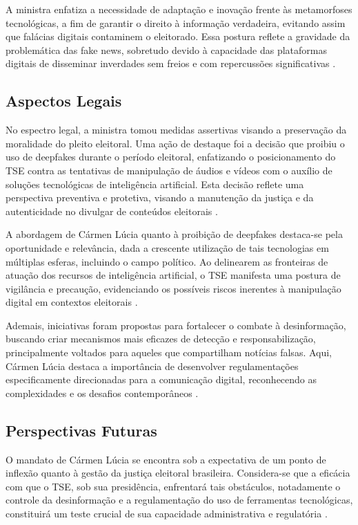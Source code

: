 \documentclass[
   article,       
   12pt,          
   oneside,       
   a4paper,       
   english,       
   brazil,        
   sumario=tradicional
   ]{abntex2}
\begin{document}
A ministra enfatiza a necessidade de adaptação e inovação frente às metamorfoses tecnológicas, a fim de garantir o direito à informação verdadeira, evitando assim que falácias digitais contaminem o eleitorado. Essa postura reflete a gravidade da problemática das fake news, sobretudo devido à capacidade das plataformas digitais de disseminar inverdades sem freios e com repercussões significativas \cite{Contra_o_virus_da_mentira_ha_o_remedio_da_inf}.

\subsection{Aspectos Legais}

No espectro legal, a ministra tomou medidas assertivas visando a preservação da moralidade do pleito eleitoral. Uma ação de destaque foi a decisão que proibiu o uso de deepfakes durante o período eleitoral, enfatizando o posicionamento do TSE contra as tentativas de manipulação de áudios e vídeos com o auxílio de soluções tecnológicas de inteligência artificial. Esta decisão reflete uma perspectiva preventiva e protetiva, visando a manutenção da justiça e da autenticidade no divulgar de conteúdos eleitorais \cite{Carmen_Lucia_toma_posse_na_presidencia_do_TSE}.

A abordagem de Cármen Lúcia quanto à proibição de deepfakes destaca-se pela oportunidade e relevância, dada a crescente utilização de tais tecnologias em múltiplas esferas, incluindo o campo político. Ao delinearem as fronteiras de atuação dos recursos de inteligência artificial, o TSE manifesta uma postura de vigilância e precaução, evidenciando os possíveis riscos inerentes à manipulação digital em contextos eleitorais \cite{Carmen_Lucia_toma_posse_na_presidencia_do_TSE}.

Ademais, iniciativas foram propostas para fortalecer o combate à desinformação, buscando criar mecanismos mais eficazes de detecção e responsabilização, principalmente voltados para aqueles que compartilham notícias falsas. Aqui, Cármen Lúcia destaca a importância de desenvolver regulamentações especificamente direcionadas para a comunicação digital, reconhecendo as complexidades e os desafios contemporâneos \cite{Mendonca_e_o_unico_ministro_do_STF_a_faltar_a}.

\subsection{Perspectivas Futuras}

O mandato de Cármen Lúcia se encontra sob a expectativa de um ponto de inflexão quanto à gestão da justiça eleitoral brasileira. Considera-se que a eficácia com que o TSE, sob sua presidência, enfrentará tais obstáculos, notadamente o controle da desinformação e a regulamentação do uso de ferramentas tecnológicas, constituirá um teste crucial de sua capacidade administrativa e regulatória \cite{Carmen_Lucia_tem_de_afastar_TSE_da_polarizaca} \cite{Pacheco_participa_da_posse_na_Carmen_Lucia_na}.
\end{document}

